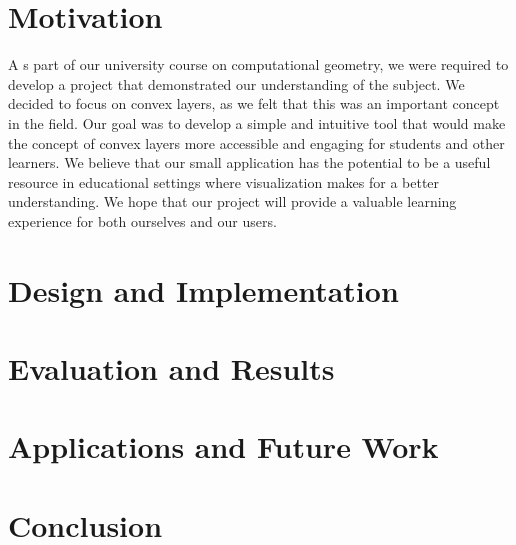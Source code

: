 \documentclass{article}
\begin{document}
\section{Motivation}
A
s part of our university course on computational geometry, we were required to develop a project that demonstrated our understanding of the subject. We decided to focus on convex layers, as we felt that this was an important concept in the field. 
\newline
\newline
Our goal was to develop a simple and intuitive tool that would make the concept of convex layers more accessible and engaging for students and other learners. We believe that our small application has the potential to be a useful resource in educational settings where visualization makes for a better understanding. We hope that our project will provide a valuable learning experience for both ourselves and our users.

\section{Design and Implementation}

\section{Evaluation and Results}

\section{Applications and Future Work}

\section{Conclusion}
\end{document}
